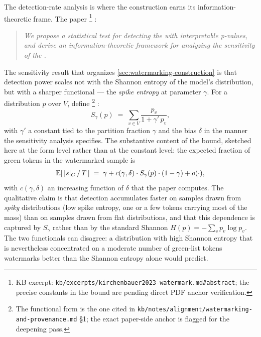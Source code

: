 The detection-rate analysis is where the construction earns its
information-theoretic frame. The paper%
\footnote{KB excerpt: \nolinkurl{kb/excerpts/kirchenbauer2023-watermark.md#abstract};
the precise constants in the bound are pending direct PDF anchor
verification.}
\citep[\S{}abstract]{kirchenbauer2023-watermark}:

\begin{quote}\itshape
We propose a statistical test for detecting the  with
interpretable p-values, and derive an information-theoretic framework
for analyzing the sensitivity of the .
\end{quote}

The sensitivity result that organizes \cref{sec:watermarking-construction}
is that detection power scales not with the Shannon entropy of the
model's distribution, but with a sharper functional --- the
\emph{spike entropy} at parameter $\gamma$. For a distribution
$p$ over $V$, define%
\footnote{The functional form is the one cited in
\nolinkurl{kb/notes/alignment/watermarking-and-provenance.md} \S 1; the
exact paper-side anchor is flagged for the deepening pass.}
:
\[
S_\gamma(p) \;=\; \sum_{v \in V} \frac{p_v}{1 + \gamma' \, p_v},
\]
with $\gamma'$ a constant tied to the partition fraction $\gamma$ and
the bias $\delta$ in the manner the sensitivity analysis specifies. The
substantive content of the bound, sketched here at the form level
rather than at the constant level: the expected fraction of green
tokens in the watermarked sample is
\[
\operatorname{\mathbb{E}}[\,|s|_G \,/\, T\,] \;=\; \gamma + c(\gamma, \delta) \cdot S_\gamma(p) \cdot (1 - \gamma) + o(\cdot),
\]
with $c(\gamma, \delta)$ an increasing function of $\delta$ that the
paper computes. The qualitative claim is that detection accumulates
faster on samples drawn from \emph{spiky} distributions (low spike
entropy, one or a few tokens carrying most of the mass) than on
samples drawn from flat distributions, and that this dependence is
captured by $S_\gamma$ rather than by the standard Shannon
$H(p) = -\sum_v p_v \log p_v$. The two functionals can disagree: a
distribution with high Shannon entropy that is nevertheless
concentrated on a moderate number of green-list tokens watermarks
better than the Shannon entropy alone would predict.

